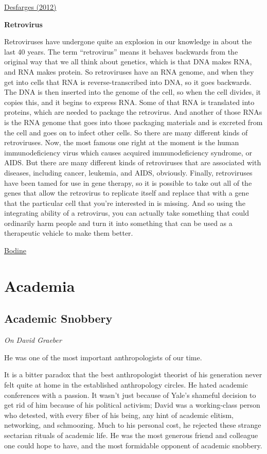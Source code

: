 \documentclass[
]{book}
\begin{document}
\href{https://www.ncbi.nlm.nih.gov/pmc/articles/PMC7120651/}{Desfarges (2012)}

\textbf{Retrovirus}

Retroviruses have undergone quite an explosion in our knowledge in about the last 40 years. The term ``retrovirus'' means it behaves backwards from the original way that we all think about genetics, which is that DNA makes RNA, and RNA makes protein. So retroviruses have an RNA genome, and when they get into cells that RNA is reverse-transcribed into DNA, so it goes backwards. The DNA is then inserted into the genome of the cell, so when the cell divides, it copies this, and it begins to express RNA. Some of that RNA is translated into proteins, which are needed to package the retrovirus. And another of those RNAs is the RNA genome that goes into those packaging materials and is excreted from the cell and goes on to infect other cells. So there are many different kinds of retroviruses. Now, the most famous one right at the moment is the human immunodeficiency virus which causes acquired immunodeficiency syndrome, or AIDS. But there are many different kinds of retroviruses that are associated with diseases, including cancer, leukemia, and AIDS, obviously. Finally, retroviruses have been tamed for use in gene therapy, so it is possible to take out all of the genes that allow the retrovirus to replicate itself and replace that with a gene that the particular cell that you're interested in is missing. And so using the integrating ability of a retrovirus, you can actually take something that could ordinarily harm people and turn it into something that can be used as a therapeutic vehicle to make them better.

\href{https://www.genome.gov/genetics-glossary/Retrovirus}{Bodine}

\hypertarget{academia}{%
\chapter{Academia}\label{academia}}

\hypertarget{academic-snobbery}{%
\section{Academic Snobbery}\label{academic-snobbery}}

\emph{On David Graeber}

He was one of the most important anthropologists of our time.

It is a bitter paradox that the best anthropologist theorist of his generation never felt quite at home in the established anthropology circles. He hated academic conferences with a passion. It wasn't just because of Yale's shameful decision to get rid of him because of his political activism; David was a working-class person who detested, with every fiber of his being, any hint of academic elitism, networking, and schmoozing. Much to his personal cost, he rejected these strange sectarian rituals of academic life. He was the most generous friend and colleague one could hope to have, and the most formidable opponent of academic snobbery.
\end{document}

